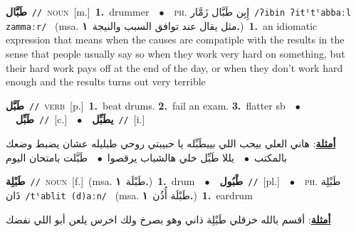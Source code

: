 \documentclass[10pt,a4paper,twoside]{article} %
\begin{document}
\begin{multicols}{2}
{\setlength\topsep{0pt}\textbf{\foreignlanguage{arabic}{طَبَّال}}\ {\color{gray}\texttt{//}\color{black}}\ \textsc{noun}\ [m.]\ \textbf{1.}~drummer\ \ $\bullet$\ \ \textsc{ph.} \color{gray} \foreignlanguage{arabic}{إِبِن طَبَّال زَمَّار}\color{black}\ {\color{gray}\texttt{/{\sffamily ʔibin ʔitˤtˤabbaːl zammaːr}/}\color{black}}\ \color{gray} (msa. \foreignlanguage{arabic}{مثل يقال عند توافق السبب والنيجة}~\foreignlanguage{arabic}{\textbf{١.}})\color{black}\ \textbf{1.}~an idiomatic expression that means  when the causes are compatiple with the results in the sense that people usually say so when they work very hard on something, but their hard work pays off at the end of the day, or when they don't work hard enough and the results turns out very terrible\ } \vspace{2mm}

{\setlength\topsep{0pt}\textbf{\foreignlanguage{arabic}{طَبَّل}}\ {\color{gray}\texttt{//}\color{black}}\ \textsc{verb}\ [p.]\ \textbf{1.}~beat drums.  \textbf{2.}~fail an exam.  \textbf{3.}~flatter sb\ \ $\bullet$\ \ \setlength\topsep{0pt}\textbf{\foreignlanguage{arabic}{طَبِّل}}\ {\color{gray}\texttt{//}\color{black}}\ [c.]\ \ $\bullet$\ \ \setlength\topsep{0pt}\textbf{\foreignlanguage{arabic}{يطَبِّل}}\ {\color{gray}\texttt{//}\color{black}}\ [i.]\  \begin{flushright}\color{gray}\foreignlanguage{arabic}{\textbf{\underline{\foreignlanguage{arabic}{أمثلة}}}: هاني العلي بيحب اللي بييطَبِّله يا حبيبتي روحي طبليله عشان يضبط وضعك بالمكتب\ $\bullet$\ \  يللا طَبِّل خلي هالشباب يرقصوا\ $\bullet$\ \  طَبَّلت بامتحان اليوم}\end{flushright}\color{black}} \vspace{2mm}

{\setlength\topsep{0pt}\textbf{\foreignlanguage{arabic}{طَبْلِة}}\ {\color{gray}\texttt{//}\color{black}}\ \textsc{noun}\ [f.]\ \color{gray}(msa. \foreignlanguage{arabic}{طَبْلَة}~\foreignlanguage{arabic}{\textbf{١.}})\color{black}\ \textbf{1.}~drum\ \ $\bullet$\ \ \setlength\topsep{0pt}\textbf{\foreignlanguage{arabic}{طْبُول}}\ {\color{gray}\texttt{//}\color{black}}\ [pl.]\ \ $\bullet$\ \ \textsc{ph.} \color{gray} \foreignlanguage{arabic}{طَبْلِة ذَان}\color{black}\ {\color{gray}\texttt{/{\sffamily tˤablit (d)aːn}/}\color{black}}\ \color{gray} (msa. \foreignlanguage{arabic}{طَبْلَة أُذُن}~\foreignlanguage{arabic}{\textbf{١.}})\color{black}\ \textbf{1.}~eardrum\  \begin{flushright}\color{gray}\foreignlanguage{arabic}{\textbf{\underline{\foreignlanguage{arabic}{أمثلة}}}: أقسم بالله خزقلي طَبْلِة ذاني وهو بصرخ ولك اخرس يلعن أبو اللي نفضك}\end{flushright}\color{black}} \vspace{2mm}


\end{multicols}
\end{document}

